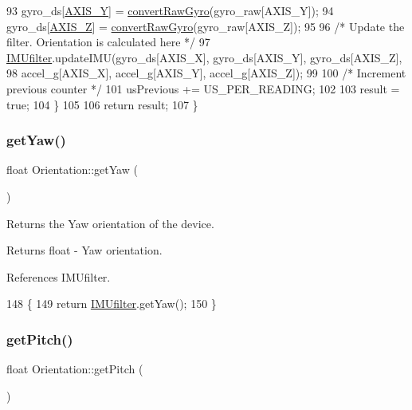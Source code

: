 \begin{DoxyCode}
93     gyro\_ds[\hyperlink{_orientation_8cpp_a08f3e26d90cf66bf2840d476e5d4711f}{AXIS\_Y}] = \hyperlink{class_orientation_a99bb5ed3c3226c5d636fa48f26f491dd}{convertRawGyro}(gyro\_raw[AXIS\_Y]);
94     gyro\_ds[\hyperlink{_orientation_8cpp_a220ebc22eb87c8989bfd63ae3cbbe2a8}{AXIS\_Z}] = \hyperlink{class_orientation_a99bb5ed3c3226c5d636fa48f26f491dd}{convertRawGyro}(gyro\_raw[AXIS\_Z]);
95 
96     \textcolor{comment}{/* Update the filter. Orientation is calculated here */}
97     \hyperlink{class_orientation_a3b0d70328334e69797438ccc408806c1}{IMUfilter}.updateIMU(gyro\_ds[AXIS\_X], gyro\_ds[AXIS\_Y], gyro\_ds[AXIS\_Z],
98                         accel\_g[AXIS\_X], accel\_g[AXIS\_Y], accel\_g[AXIS\_Z]);
99 
100     \textcolor{comment}{/* Increment previous counter */}
101     usPrevious += US\_PER\_READING;
102 
103     result = \textcolor{keyword}{true};
104   \}
105 
106   \textcolor{keywordflow}{return} result;
107 \}
\end{DoxyCode}
\mbox{\label{class_orientation_a3dbaa1ee014811c40d5b9f39b544c19b}} 
\subsubsection{\texorpdfstring{get\+Yaw()}{getYaw()}}
{\footnotesize\ttfamily float Orientation\+::get\+Yaw (\begin{DoxyParamCaption}{ }\end{DoxyParamCaption})}



Returns the Yaw orientation of the device. 

\begin{DoxyReturn}{Returns}
float -\/ Yaw orientation. 
\end{DoxyReturn}


References I\+M\+Ufilter.


\begin{DoxyCode}
148 \{
149   \textcolor{keywordflow}{return} \hyperlink{class_orientation_a3b0d70328334e69797438ccc408806c1}{IMUfilter}.getYaw();
150 \}
\end{DoxyCode}
\mbox{\label{class_orientation_a7ec1a2964fc858bbd5da22a505b087c8}} 
\subsubsection{\texorpdfstring{get\+Pitch()}{getPitch()}}
{\footnotesize\ttfamily float Orientation\+::get\+Pitch (\begin{DoxyParamCaption}{ }\end{DoxyParamCaption})}



